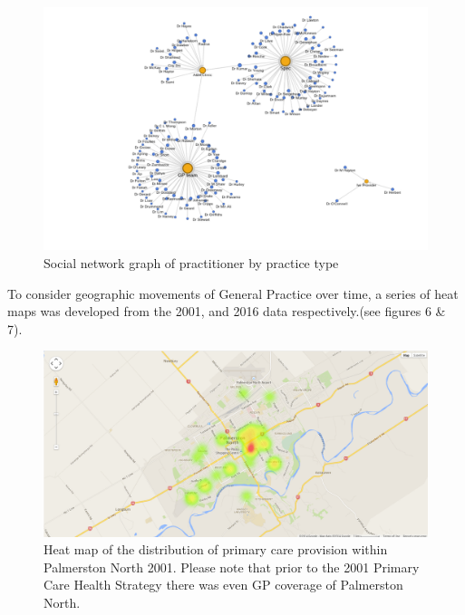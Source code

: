\documentclass[11pt,a4paper]{article}
\begin{document}
\begin{figure}[htp]
\centering
\includegraphics[scale=0.30]{fig5.png}
\caption{Social network graph of practitioner by practice type}
\label{Social network graph of practitioner by practice type}
\end{figure}

To consider geographic movements of General Practice over time, a series of heat maps was developed from the 2001, and 2016 data respectively.(see figures 6 \& 7).\\ 

\begin{figure}[htp]
\centering
\includegraphics[scale=0.3]{fig6.png}
\caption{Heat map of the distribution of primary care provision within Palmerston North 2001. Please note that prior to the 2001 Primary Care Health Strategy there was even GP coverage of Palmerston North.}
\label{Heat map of practitioners 2001}
\end{figure}  
\end{document}

